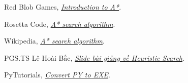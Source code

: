 \cleardoublepage
{}
{}
\begin{thebibliography}{99}

Red Blob Games, \textit{\href{https://www.redblobgames.com/pathfinding/a-star/introduction.html}{Introduction to A*}}.

Rosetta Code, \textit{\href{https://rosettacode.org/wiki/A*_search_algorithm}{A* search algorithm}}.

Wikipedia, \textit{\href{https://en.wikipedia.org/wiki/A*_search_algorithm}{A* search algorithm}}.

PGS.TS Lê Hoài Bắc, \textit{\href{https://drive.google.com/drive/folders/1Jre3ev47bMdiNgA3Qi26fpVJ5tFOBrx1}{Slide bài giảng về Heuristic Search}}.

PyTutorials, \textit{\href{https://www.youtube.com/watch?v=lOIJIk_maO4}{Convert PY to EXE}}.

\end{thebibliography}
